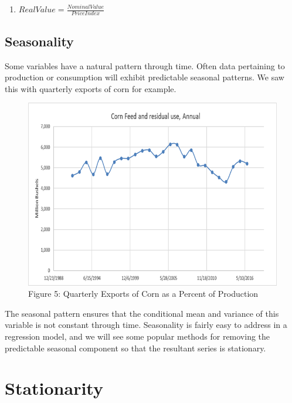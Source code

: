 \documentclass[]{book}
\providecommand{\tightlist}{%
  \setlength{\itemsep}{0pt}\setlength{\parskip}{0pt}}
\theoremstyle{definition}
\theoremstyle{definition}
\theoremstyle{remark}
\begin{document}
\begin{enumerate}
\def\labelenumi{(\arabic{enumi})}
\setcounter{enumi}{1}
\tightlist
\item
  \(Real Value = \frac{Nominal Value}{Price Index}\)
\end{enumerate}

\subsection{Seasonality}\label{seasonality}

Some variables have a natural pattern through time. Often data
pertaining to production or consumption will exhibit predictable
seasonal patterns. We saw this with quarterly exports of corn for
example.

\begin{figure}[htbp]
\centering
\includegraphics{Excel-files/IntroductiontoCommodityTS-FeedGrains_Corn_files/image026.png}
\caption{Figure 5: Quarterly Exports of Corn as a Percent of Production}
\end{figure}

The seasonal pattern ensures that the conditional mean and variance of
this variable is not constant through time. Seasonality is fairly easy
to address in a regression model, and we will see some popular methods
for removing the predictable seasonal component so that the resultant
series is stationary.

\section{Stationarity}\label{stationarity}
\end{document}
